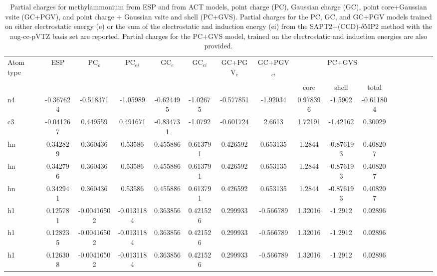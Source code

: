 \begin{sidewaystable}
\caption{Partial charges for methylammonium from ESP and from ACT models, point charge (PC), Gaussian charge (GC), point core+Gaussian vsite (GC+PGV), and point charge + Gaussian vsite and shell (PC+GVS).  Partial charges for the PC, GC, and GC+PGV models trained on either electrostatic energy (e) or the sum of the electrostatic and induction energy (ei) from the SAPT2+(CCD)-$\delta$MP2 method with the aug-cc-pVTZ basis set are reported. Partial charges for the PC+GVS model, trained on the electrostatic and induction energies are also provided.}
\hspace{-1cm}
\begin{tabular}{lcccccccccccccccc}
\hline
 Atom type & ESP & PC$_{e}$ & PC$_{ei}$ & GC$_{e}$ & GC$_{ei}$ & GC+PGV$_{e}$ & GC+PGV$_{ei}$ & \multicolumn{3}{c}{PC+GVS} \\\\
 & & & & & & & & core & shell & total \\
\hline
 n4 & -0.367624 & -0.518371 & -1.05989 & -0.624495 &  -1.02675 & -0.577851 &  -1.92034 & 0.978396 & -1.5902 & -0.611804 \\
 c3 & -0.041267 & 0.449559 & 0.491671 & -0.834731 &  -1.0792 & -0.601724 &  2.6613 & 1.72191 & -1.42162 & 0.30029 \\
 hn & 0.342829 & 0.360436 & 0.53586 & 0.455886 &  0.613791 & 0.426592 &  0.653135 & 1.2844 & -0.876193 & 0.408207 \\
 hn & 0.342796 & 0.360436 & 0.53586 & 0.455886 &  0.613791 & 0.426592 &  0.653135 & 1.2844 & -0.876193 & 0.408207 \\
 hn & 0.342941 & 0.360436 & 0.53586 & 0.455886 &  0.613791 & 0.426592 &  0.653135 & 1.2844 & -0.876193 & 0.408207 \\
 h1 & 0.125781 & -0.00416502 & -0.0131184 & 0.363856 &  0.421526 & 0.299933 &  -0.566789 & 1.32016 & -1.2912 & 0.02896 \\
 h1 & 0.128235 & -0.00416502 & -0.0131184 & 0.363856 &  0.421526 & 0.299933 &  -0.566789 & 1.32016 & -1.2912 & 0.02896 \\
 h1 & 0.126308 & -0.00416502 & -0.0131184 & 0.363856 &  0.421526 & 0.299933 &  -0.566789 & 1.32016 & -1.2912 & 0.02896 \\
\hline
\end{tabular}
\end{sidewaystable}
